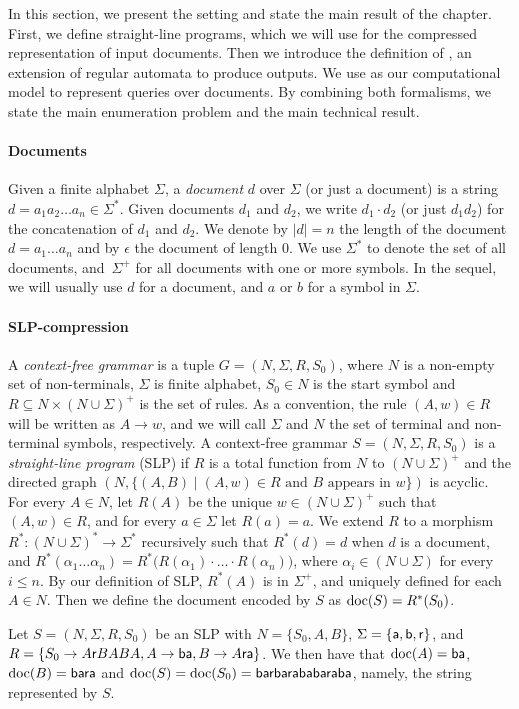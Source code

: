 In this section, we present the setting and state the main result of the chapter. 
First, we define straight-line programs, which we will use for the compressed representation of input documents. Then we introduce the definition of \rtname, an extension of regular automata to produce outputs. We use \rtnames as our computational model to represent queries over documents. 
By combining both formalisms, we state the main enumeration problem and the main technical result. %

\paragraph{Documents} 
Given a finite alphabet $\Sigma$, a \emph{document} $d$ over $\Sigma$ (or just a document) is a string $d = a_1 a_2 \ldots a_n\in\Sigma^*$. Given documents $d_1$ and $d_2$, we write $d_1 \cdot d_2$ (or just $d_1d_2$) for the concatenation of $d_1$ and $d_2$. We denote by $|d| = n$ the length of the document $d = a_1 \ldots a_n$ and by $\epsilon$ the document of length $0$. 
We use $\Sigma^*$ to denote the set of all documents, and~$\Sigma^+$ for all documents with one or more symbols.
In the sequel, we will usually use $d$ for a document, and $a$ or $b$ for a symbol in $\Sigma$. 

\paragraph{SLP-compression} 
A \emph{context-free grammar} is a tuple $G = (N,\Sigma,R,S_0)$, where $N$ is a non-empty set of non-terminals, $\Sigma$ is finite alphabet, $S_0\in N$ is the start symbol and $R\subseteq N \times(N \cup\Sigma)^{+}$ is the set of rules. As a convention, the rule $(A,w) \in R$ will be written as $A\to w$, and we will call $\Sigma$ and $N$ the set of terminal and non-terminal symbols, respectively. A context-free grammar $S = (N,\Sigma,R,S_0)$ is a \emph{straight-line program} (SLP) if $R$ is a total function from $N$ to $(N \cup\Sigma)^{+}$ and the directed graph $(N, \{(A,B)\mid (A,w) \in R \text{ and } B\text{ appears in } w\})$ is acyclic. 
For every $A \in N$, let $R(A)$ be the unique $w \in (N \cup\Sigma)^{+}$ such that $(A,w) \in R$, and for every $a \in \Sigma$ let $R(a) = a$.
We extend $R$ to a morphism $R^*: (N \cup\Sigma)^*\to \Sigma^*$ recursively such that $R^*(d) = d$ when $d$ is a document, and $R^*(\alpha_1 \ldots \alpha_n) = R^*\big(R(\alpha_1) \cdot \ldots \cdot R(\alpha_n)\big)$, where $\alpha_i \in (N \cup \Sigma)$ for every $i \leq n$. 
By our definition of SLP, $R^*(A)$ is in $\Sigma^+$, and uniquely defined for each $A\in N$. 
Then we define the document encoded by $S$ as $\operatorname{doc}(S) = R^*(S_0)$.
\begin{example}	
	Let $S = (N, \Sigma, R, S_0)$ be an SLP with $N = \{S_0, A, B\}$, $\Sigma = \{{\sf a}, {\sf b}, {\sf r}\}$, and $R = \{S_0 \to A{\sf r}BABA, A\to {\sf ba}, B \to A{\sf ra}\}$. We then have that $\operatorname{doc}(A) = {\sf ba}$, $\operatorname{doc}(B) = {\sf bara}$ and $\operatorname{doc}(S) = \operatorname{doc}(S_0) = {\sf barbarababaraba}$, namely, the string represented by $S$.%
\end{example}

